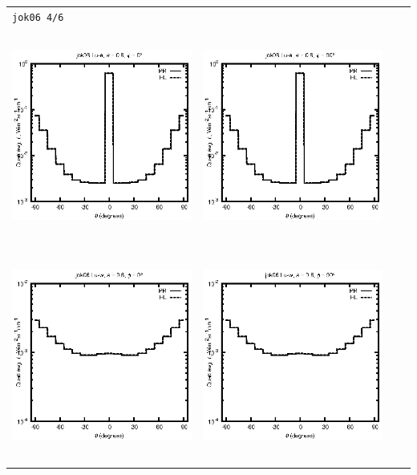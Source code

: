 \documentclass[10pt,a4paper]{article}
\begin{document}
\begin{adjustwidth}{-1.2in}{-1.2in}
\begin{tabular}{c c c c}
\multicolumn{4}{l}{\texttt{jok06 4/6}} \\
\includegraphics[height=7cm]{../eps/jok06_Lu_a_fwd.eps} &
\includegraphics[height=7cm]{../eps/jok06_Lu_a_cross.eps}\\
\includegraphics[height=7cm]{../eps/jok06_Lu_w_fwd.eps} &
\includegraphics[height=7cm]{../eps/jok06_Lu_w_cross.eps} \\

\end{tabular}
\end{adjustwidth}
\end{document}
